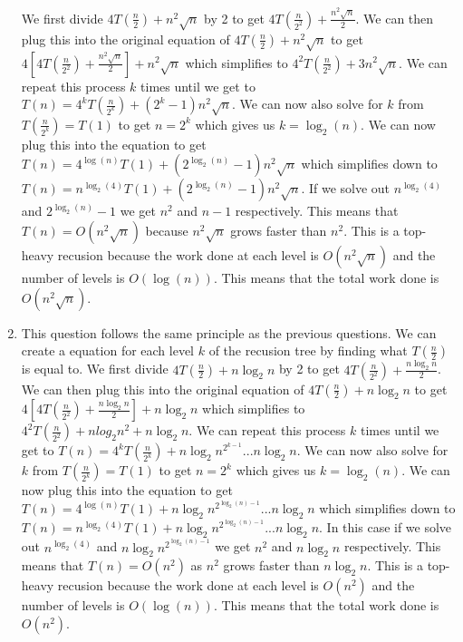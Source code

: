 \documentclass[12pt,letterpaper]{article}
\begin{document}
\begin{enumerate}
    We first divide $4T(\frac{n}{2})+n^2\sqrt{n}$ by 2 to get $4T(\frac{n}{2^2}) + \frac{n^2\sqrt{n}}{2}$. 
    We can then plug this into the original equation of $4T(\frac{n}{2})+n^2\sqrt{n}$ to get $4[4T(\frac{n}{2^2}) + \frac{n^2\sqrt{n}}{2}] + n^2\sqrt{n}$ which
    simplifies to $4^2T(\frac{n}{2^2}) + 3n^2\sqrt{n}$. We can repeat this process $k$ times until we get to $T(n) = 4^kT(\frac{n}{2^k}) + (2^k-1)n^2\sqrt{n}$.
    We can now also solve for $k$ from $T(\frac{n}{2^k}) = T(1)$ to get $n = 2^k$ which gives us $k = \log_2(n)$. We can now plug this into the equation to get $T(n) = 4^{\log(n)}T(1) + (2^{\log_2(n)}-1)n^2\sqrt{n}$ which
    simplifies down to $T(n) = n^{\log_2(4)}T(1) + (2^{\log_2(n)}-1)n^2\sqrt{n}$. If we solve out $n^{\log_2(4)}$ and $2^{\log_2(n)}-1$ we get $n^2$ and $n-1$ respectively.
    This means that $T(n) = O(n^2\sqrt{n})$ because $n^2\sqrt{n}$ grows faster than $n^2$. This is a top-heavy recusion because the work done at each level is $O(n^2\sqrt{n})$ and the number of levels is $O(\log(n))$. This means that the total work done is $O(n^2\sqrt{n})$.
    \item This question follows the same principle as the previous questions. We can create a equation for each level $k$ of the recusion tree by finding what $T(\frac{n}{2})$ is equal to.
    We first divide $4T(\frac{n}{2})+n\log_2n$ by 2 to get $4T(\frac{n}{2^2}) + \frac{n\log_2n}{2}$. We can then plug this into the original equation of $4T(\frac{n}{2})+n\log_2n$ to get $4[4T(\frac{n}{2^2}) + \frac{n\log_2n}{2}] + n\log_2n$ which
    simplifies to $4^2T(\frac{n}{2^2}) + nlog_2n^2 + n\log_2n$. We can repeat this process $k$ times until we get to $T(n) = 4^kT(\frac{n}{2^k}) + n\log_2n^{2^{k-1}} ... n\log_2n$. 
    We can now also solve for $k$ from $T(\frac{n}{2^k}) = T(1)$ to get $n = 2^k$ which gives us $k = \log_2(n)$. 
    We can now plug this into the equation to get $T(n) = 4^{\log(n)}T(1) + n\log_2n^{2^{\log_2(n)-1}} ... n\log_2n$ which
    simplifies down to $T(n) = n^{\log_2(4)}T(1) + n\log_2n^{2^{\log_2(n)-1}} ... n\log_2n$. 
    In this case if we solve out $n^{\log_2(4)}$ and $n\log_2n^{2^{\log_2(n)-1}}$ we get $n^2$ and $n\log_2n$ respectively.
    This means that $T(n) = O(n^2)$ as $n^2$ grows faster than $n\log_2n$. This is a top-heavy recusion because the work done at each level is $O(n^2)$ and the number of levels is $O(\log(n))$. This means that the total work done is $O(n^2)$.
    
\end{enumerate}

\pagebreak
\end{document}
